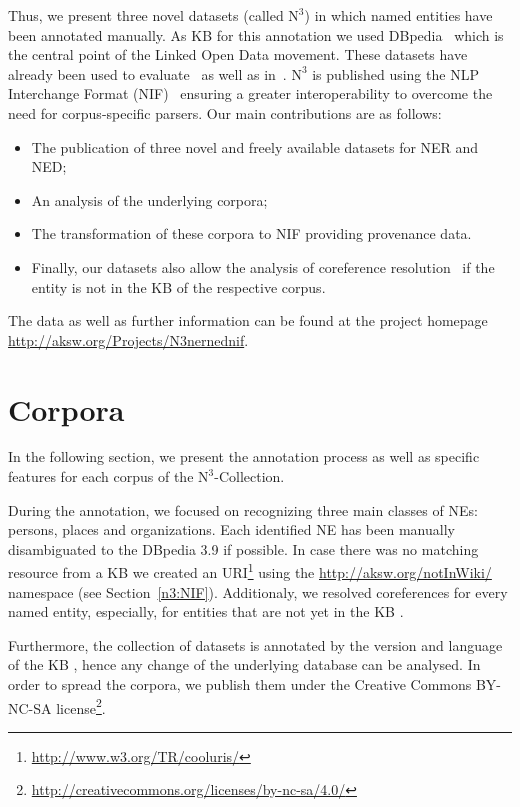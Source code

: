 Thus, we present three novel datasets (called $\mbox{N}^3$) in which named entities have been annotated manually. As \ac{KB}  for this annotation we used DBpedia~\cite{dbpedia-swj} which is the central point of the Linked Open Data movement. These datasets have already been used to evaluate~\cite{AIDA,spotlight} as well as in~\cite{GER+13,agdistis_iswc,GERBIL}.
$\mbox{N}^3$ is published using the \ac{NLP} Interchange Format (NIF)~\cite{ISWC2013NIF} ensuring a greater interoperability to overcome the need for corpus-specific parsers. 
Our main contributions are as follows:
\begin{itemize}
\item The publication of three novel and freely available datasets for \ac{NER} and \ac{NED};
\item An analysis of the underlying corpora;
\item The transformation of these corpora to NIF providing provenance data.
\item Finally, our datasets also allow the analysis of coreference resolution~\cite{NgongaNgomo2014,singh} if the entity is not in the \ac{KB}  of the respective corpus.
\end{itemize}
The data as well as further information can be found at the project homepage \url{http://aksw.org/Projects/N3nernednif}.


\section{Corpora}
\label{n3:sec:Features}




In the following section, we present the annotation process as well as specific features for each corpus of the $\mbox{N}^3$-Collection.

During the annotation, we focused on recognizing three main classes of NEs: persons, places and organizations. 
Each identified NE has been manually disambiguated to the DBpedia 3.9  if possible.
In case there was no matching resource from a \ac{KB}  we created an URI\footnote{\url{http://www.w3.org/TR/cooluris/}} using the \url{http://aksw.org/notInWiki/} namespace (see Section~\ref{n3:NIF}).
Additionaly, we resolved coreferences for every named entity, especially, for entities that are not yet in the \ac{KB} . %

Furthermore, the collection of datasets is annotated by the version and language of the \ac{KB} , hence any change of the underlying database can be analysed.
In order to spread the corpora, we publish them under the Creative Commons BY-NC-SA license\footnote{\url{http://creativecommons.org/licenses/by-nc-sa/4.0/}}.

